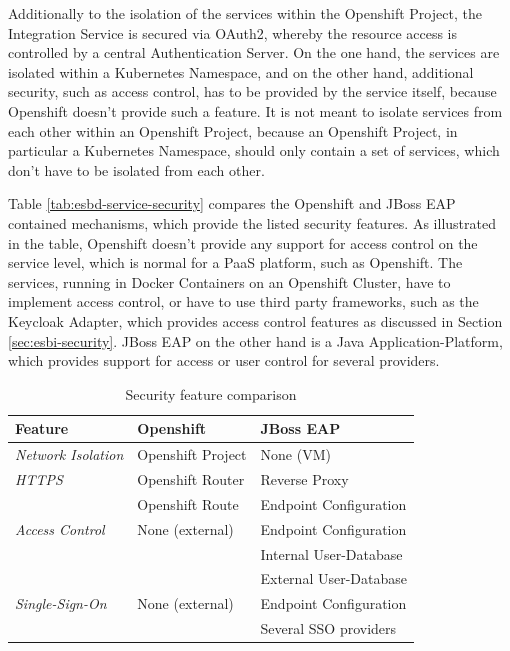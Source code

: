 Additionally to the isolation of the services within the Openshift Project, the Integration Service is secured via OAuth2, whereby the resource access is controlled by a central Authentication Server. On the one hand, the services are isolated within a Kubernetes Namespace, and on the other hand, additional security, such as access control, has to be provided by the service itself, because Openshift doesn't provide such a feature. It is not meant to isolate services from each other within an Openshift Project, because an Openshift Project, in particular a Kubernetes Namespace, should only contain a set of services, which don't have to be isolated from each other. \\
\newpage

Table \vref{tab:esbd-service-security} compares the Openshift and JBoss EAP contained mechanisms, which provide the listed security features. As illustrated in the table, Openshift doesn't provide any support for access control on the service level, which is normal for a PaaS platform, such as Openshift. The services, running in Docker Containers on an Openshift Cluster, have to implement access control, or have to use third party frameworks, such as the Keycloak Adapter, which provides access control features as discussed in Section \vref{sec:esbi-security}. JBoss EAP on the other hand is a Java Application-Platform, which provides support for access or user control for several providers. 

{\renewcommand{\arraystretch}{1.2}%
	\begin{table}[h]
		\begin{tabularx}{\textwidth}{ X|X|X }	
			\textbf{Feature}                 & \textbf{Openshift}      & \textbf{JBoss EAP} \\  \hline
			\textit{Network Isolation}       & Openshift Project       & None (VM) \\  \hline
			\textit{HTTPS}                   & Openshift Router        & Reverse Proxy \\
			                                 & Openshift Route         & Endpoint Configuration \\  \hline
            \textit{Access Control}          & None (external)         & Endpoint Configuration \\
                                                                      && Internal User-Database \\ 
                                                                      && External User-Database \\  \hline
            \textit{Single-Sign-On}          & None (external)         & Endpoint Configuration \\
                                                                      && Several SSO providers \\  \hline
		\end{tabularx}
		\caption{Security feature comparison}
		\label{tab:esbd-service-security}
\end{table}}

